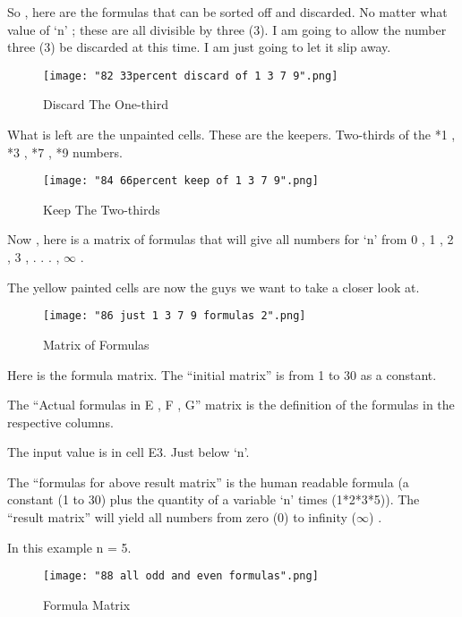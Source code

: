 \documentclass[12pt,letterpaper,oneside,titlepage]{article}
\begin{document}
	
	

\par 
So , here are the formulas that can be sorted off and discarded.  No matter what value of `n' ; these are all divisible by three (3). I am going to allow the number three (3) be discarded at this time. I am just going to let it slip away.
\begin{figure}[h]
	\centering
	\texttt{[image: "82 33percent discard of 1 3 7 9".png]}
	\caption{Discard The One-third}
\end{figure}
\pagebreak


\par 
What is left are the unpainted cells. These are the keepers. Two-thirds of the *1 , *3 , *7 , *9 numbers. 
\\	
\begin{figure}[h]
	\centering
	\texttt{[image: "84 66percent keep of 1 3 7 9".png]}
	\caption{Keep The Two-thirds}
\end{figure}
\pagebreak


\par 
Now , here is a matrix of formulas that will give all numbers for `n' from 0 , 1 , 2 , 3 , . . . , $\infty$ . 
\\
\par 
The yellow painted cells are now the guys we want to take a closer look at.				
\begin{figure}[h]
	\centering
	\texttt{[image: "86 just 1 3 7 9 formulas 2".png]}
	\caption{Matrix of Formulas}
\end{figure}
\pagebreak
			
	
\par 
Here is the formula matrix. The ``initial matrix''  is from 1 to 30 as a constant.
\\
\par 
The ``Actual formulas in E , F , G'' matrix is the definition of the formulas in the respective columns.
\\
\par 
The input value is in cell E3. Just below `n'.
\\
\par 
The ``formulas for above result matrix'' is the human readable formula (a constant (1 to 30) plus the quantity of a variable `n' times (1*2*3*5)).
The ``result matrix'' will yield all numbers from zero (0) to infinity ($\infty$) .
\\ 
\par 
In this example n = 5.
\begin{figure}[h]
	\centering
	\texttt{[image: "88 all odd and even formulas".png]}
	\caption{Formula Matrix}
\end{figure}
\pagebreak
\end{document}
